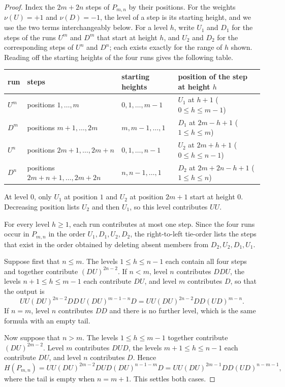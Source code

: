 \documentclass[11pt]{article}
\theoremstyle{definition}
\begin{document}
\begin{proof}
Index the $2m+2n$ steps of $P_{m,n}$ by their positions.  For the weights
$\nu(U)=+1$ and $\nu(D)=-1$, the level of a step is its starting height, and
we use the two terms interchangeably below.  For a level $h$, write $U_1$ and
$D_1$ for the steps of the runs $U^m$ and $D^m$ that start at height $h$, and
$U_2$ and $D_2$ for the corresponding steps of $U^n$ and $D^n$; each exists
exactly for the range of $h$ shown.  Reading off the starting heights of the
four runs gives the following table.

\begin{center}
\small
\renewcommand{\arraystretch}{1.25}
\begin{tabular}{@{}llll@{}}
\toprule
run & steps & starting heights & position of the step at height $h$\\
\midrule
$U^m$ & positions $1,\ldots,m$ &
   $0,1,\ldots,m-1$ & $U_1$ at $h+1$ \hfill($0\le h\le m-1$)\\
$D^m$ & positions $m+1,\ldots,2m$ &
   $m,m-1,\ldots,1$ & $D_1$ at $2m-h+1$ \hfill($1\le h\le m$)\\
$U^n$ & positions $2m+1,\ldots,2m+n$ &
   $0,1,\ldots,n-1$ & $U_2$ at $2m+h+1$ \hfill($0\le h\le n-1$)\\
$D^n$ & positions $2m+n+1,\ldots,2m+2n$ &
   $n,n-1,\ldots,1$ & $D_2$ at $2m+2n-h+1$ \hfill($1\le h\le n$)\\
\bottomrule
\end{tabular}
\end{center}

At level $0$, only $U_1$ at position $1$ and $U_2$ at position $2m+1$ start
at height $0$.  Decreasing position lists $U_2$ and then $U_1$, so this level
contributes $UU$.

For every level $h\ge1$, each run contributes at most one step.  Since the four
runs occur in $P_{m,n}$ in the order $U_1,D_1,U_2,D_2$, the right-to-left
tie-order lists the steps that exist in the order obtained by deleting absent
members from $D_2,U_2,D_1,U_1$.

Suppose first that $n\le m$.  The levels $1\le h\le n-1$ each contain all
four steps and together contribute $(DU)^{2n-2}$.  If $n<m$, level $n$
contributes $DDU$, the levels $n+1\le h\le m-1$ each contribute $DU$, and
level $m$ contributes $D$, so that the output is
\[
   UU(DU)^{2n-2}DD\,U(DU)^{m-1-n}D
   =UU(DU)^{2n-2}DD(UD)^{m-n}.
\]
If $n=m$, level $n$ contributes $DD$ and there is no further level, which is
the same formula with an empty tail.

Now suppose that $n>m$.  The levels $1\le h\le m-1$ together contribute
$(DU)^{2m-2}$.  Level $m$ contributes $DUD$, the levels
$m+1\le h\le n-1$ each contribute $DU$, and level $n$ contributes $D$.
Hence
\[
   H(P_{m,n})
   =UU(DU)^{2m-2}DUD(DU)^{n-1-m}D
   =UU(DU)^{2m-1}DD(UD)^{n-m-1},
\]
where the tail is empty when $n=m+1$.  This settles both cases.
\end{proof}
\end{document}
